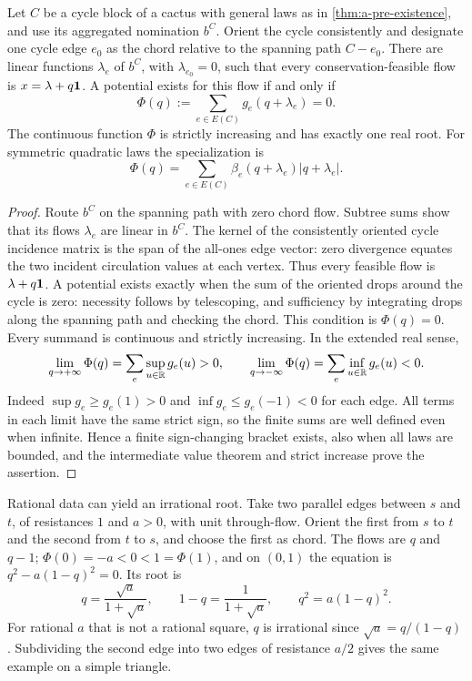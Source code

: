 \begin{lemma}
\label{lem:a-pre-cycle}
Let $C$ be a cycle block of a cactus with general laws as in
\cref{thm:a-pre-existence}, and use its aggregated nomination $b^C$. Orient the cycle consistently
and designate one cycle edge $e_0$ as the chord relative to the spanning
path $C-e_0$. There are linear functions $\lambda_e$ of $b^C$, with
$\lambda_{e_0}=0$, such that every conservation-feasible flow is
$x=\lambda+q\mathbf{1}$. A potential exists for this flow if and only if
\[
 \Phi(q):=\sum_{e\in E(C)}g_e(q+\lambda_e)=0.
\]
The continuous function $\Phi$ is strictly increasing and has exactly
one real root. For symmetric quadratic laws the specialization is
\[
 \Phi(q)=\sum_{e\in E(C)}\beta_e(q+\lambda_e)|q+\lambda_e|.
\]
\end{lemma}
\begin{proof}
Route $b^C$ on the spanning path with zero chord flow. Subtree sums show
that its flows $\lambda_e$ are linear in $b^C$. The kernel of the consistently
oriented cycle incidence matrix is the span of the all-ones edge vector:
zero divergence equates the two incident circulation values at each
vertex. Thus every feasible flow is $\lambda+q\mathbf{1}$. A potential exists
exactly when the sum of the oriented drops around the cycle is zero:
necessity follows by telescoping, and sufficiency by integrating drops
along the spanning path and checking the chord. This condition is
$\Phi(q)=0$.
Every summand is continuous and strictly increasing. In the extended
real sense,
\[
 \lim_{q\to+\infty}\Phi(q)=\sum_e\sup_{u\in\mathbb{R}}g_e(u)>0,\qquad
 \lim_{q\to-\infty}\Phi(q)=\sum_e\inf_{u\in\mathbb{R}}g_e(u)<0.
\]
Indeed $\sup g_e\ge g_e(1)>0$ and $\inf g_e\le g_e(-1)<0$ for each
edge. All terms in each limit have the same strict sign, so the finite
sums are well defined even when infinite. Hence a finite sign-changing
bracket exists, also when all laws are bounded, and the intermediate
value theorem and strict increase prove the assertion.
\end{proof}

Rational data can yield an irrational root. Take two parallel edges
between $s$ and $t$, of resistances $1$ and $a>0$, with unit through-flow.
Orient the first from $s$ to $t$ and the second from $t$ to $s$, and
choose the first as chord. The flows are $q$ and $q-1$;
$\Phi(0)=-a<0<1=\Phi(1)$, and on $(0,1)$ the equation is
$q^2-a(1-q)^2=0$. Its root is
\[
 q=\frac{\sqrt a}{1+\sqrt a},\qquad
 1-q=\frac{1}{1+\sqrt a},\qquad q^2=a(1-q)^2.
\]
For rational $a$ that is not a rational square, $q$ is irrational since
$\sqrt a=q/(1-q)$. Subdividing the second edge into two edges of
resistance $a/2$ gives the same example on a simple triangle.

